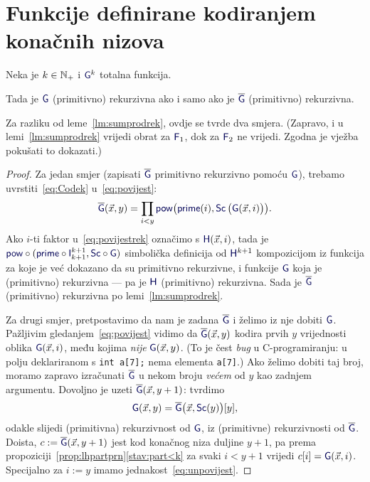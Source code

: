 \section{Funkcije definirane kodiranjem konačnih nizova}

\begin{lema}\label{lm:povijestrek}
Neka je $k\in{\mathbb N}_+$ i $\f{G}^k$ totalna funkcija.

Tada je ${\f G}$ (primitivno) rekurzivna ako i samo ako je $\overline{\f G}$ (primitivno) rekurzivna.
\end{lema}

Za razliku od leme~\ref{lm:sumprodrek}, ovdje se tvrde dva smjera. (Zapravo, i u lemi~\ref{lm:sumprodrek} vrijedi obrat za $\f F_1$, dok za $\f F_2$ ne vrijedi. Zgodna je vježba pokušati to dokazati.)
\begin{proof}
Za jedan smjer (zapisati $\overline{\f G}$ primitivno rekurzivno pomoću $\f G$), trebamo uvrstiti~\eqref{eq:Codek} u~\eqref{eq:povijest}:
\begin{equation}\label{eq:povijestrek}
    \overline{\f G}(\vec x,y)=\prod_{i<y}\f{pow}\bigl(\f{prime}(i),\f{Sc}\,\bigl(\f{G}(\vec x,i)\bigr)\bigr)\text.
\end{equation}
Ako $i$-ti faktor u~\eqref{eq:povijestrek} označimo s $\f H(\vec x,i)$, tada je $\f{pow}\circ(\f{prime}\circ\f I_{k+1}^{k+1},\f{Sc}\circ\f G)$ sim\-bo\-li\-čka definicija od $\f H^{k+1}$ kompozicijom iz funkcija za koje je već dokazano da su primitivno rekurzivne, i funkcije $\f G$ koja je (primitivno) rekurzivna --- pa je $\f H$ (primitivno) rekurzivna. Sada je $\overline{\f G}$ (primitivno) rekurzivna po lemi~\ref{lm:sumprodrek}.

Za drugi smjer, pretpostavimo da nam je zadana $\overline{\f G}$ i želimo iz nje dobiti $\f G$. Pažljivim gledanjem~\eqref{eq:povijest} vidimo da $\overline{\f G}(\vec x,y)$ kodira prvih $y$ vrijednosti oblika $\f G(\vec x,i)$, među kojima \emph{nije} $\f G(\vec x,y)$. (To je čest \emph{bug} u C-programiranju: u polju deklariranom s \texttt{int a[7];} nema elementa \texttt{a[7]}.) Ako želimo dobiti taj broj, moramo zapravo izračunati $\overline{\f G}$ u nekom broju \emph{većem} od $y$ kao zadnjem argumentu. Dovoljno je uzeti $\overline{\f G}(\vec x,y+1)$: tvrdimo
\begin{equation}\label{eq:unpovijest}
    \f G(\vec x,y)=\overline{\f G}\bigl(\vec x,\f{Sc}(y)\bigr)[y]\text,
\end{equation}
odakle slijedi (primitivna) rekurzivnost od $\f G$, iz (primitivne) rekurzivnosti od $\overline{\f G}$. Doista, $c:=\overline{\f G}(\vec x,y+1)$ jest kod konačnog niza duljine $y+1$, pa prema propoziciji~\ref{prop:lhpartprn}\eqref{stav:part<k} za svaki $i<y+1$ vrijedi $c[i]=\f G(\vec x,i)$. Specijalno za $i:=y$ imamo jednakost~\eqref{eq:unpovijest}.
\end{proof}

